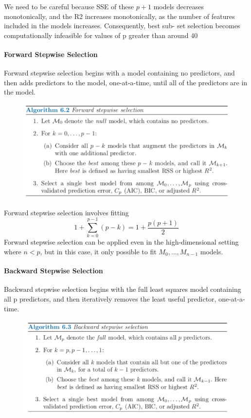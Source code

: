 We need to be careful because SSE of these $p + 1$ models decreases monotonically, and the R2 increases monotonically, as the number of features included in the models increases.
Consequently, best sub- set selection becomes computationally infeasible for values of p greater than around 40

\paragraph{Forward Stepwise Selection}

Forward stepwise selection begins with a model containing no predictors, and then adds predictors to the model, one-at-a-time, until all of the predictors are in the model.
\begin{figure}[!ht]
    \centering
    \includegraphics[scale=0.6]{SRC/StatisticalLearning/ForwardStepwiseSelection.png}
\end{figure}

Forward stepwise selection involves fitting
\[ 1 + \sum_{k=0}^{p-1} (p-k) = 1 + \frac{p(p+1)}{2} \]
Forward stepwise selection can be applied even in the high-dimensional setting where $n<p$, but in this case, it only possible to fit $M_0,..., M_{n-1}$ models.

\paragraph{Backward Stepwise Selection}
Backward stepwise selection begins with the full least squares model containing all p predictors, and then iteratively removes the least useful predictor, one-at-a-time.

\begin{figure}[!ht]
    \centering
    \includegraphics[scale=0.6]{SRC/StatisticalLearning/BackwardStepwiseSelection.png}
\end{figure}


